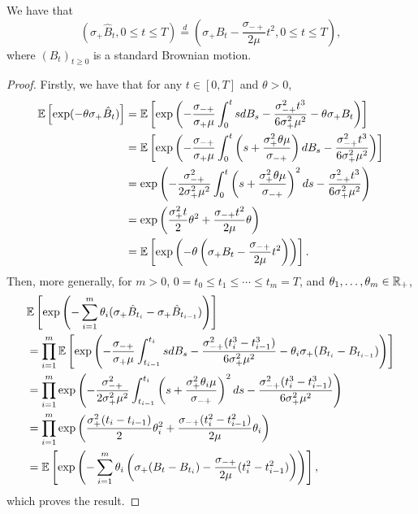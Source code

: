  \begin{proposition}
 \label{prop:characterizelimitprocess}
 We have that
 $$(\sigma_+ \hat{B}_t, {0\leq t\leq T})\overset{d}{=}\left(\sigma_+ B_t-\frac{\sigma_{-+}}{2\mu}t^2, {0\leq t\leq T}\right),$$
 where $(B_t)_{t\geq 0}$ is a standard Brownian motion.
 \end{proposition}
 \begin{proof}
 Firstly, we have that for any $t\in [0,T]$ and $\theta>0$,
 \begin{align*} {\mathbb E}\left[\exp(-\theta \sigma_+ \hat{B}_t)\right] &= {\mathbb E} \left[ \exp\left(-\frac{\sigma_{-+}}{\sigma_+ \mu}\int_0^t s dB_s-\frac{\sigma_{-+}^2 t^3}{6\sigma_+^2\mu^2}-\theta\sigma_+ B_t  \right)\right]\\
 &={\mathbb E}\left[\exp \left( -\frac{\sigma_{-+}}{\sigma_+ \mu}\int_0^t \left(s+\frac{\sigma_+^2\theta \mu}{\sigma_{-+}}\right) dB_s -\frac{\sigma_{-+}^2 t^3}{6\sigma_+^2\mu^2}\right)\right] \\
 &= \exp\left(-\frac{\sigma_{-+}^2}{2\sigma_+^2 \mu^2}\int_0^t \left(s+\frac{\sigma_+^2\theta \mu}{\sigma_{-+}}\right)^2 ds -\frac{\sigma_{-+}^2 t^3}{6\sigma_+^2\mu^2}\right)\\
 &=\exp\left(\frac{\sigma_+^2 t}{2}\theta^2+\frac{\sigma_{-+} t^2}{2\mu}\theta \right)\\
 &= {\mathbb E} \left[\exp\left(-\theta\left(\sigma_+ B_t - \frac{\sigma_{-+}}{2\mu} t^2\right)\right)\right].
 \end{align*}
 Then, more generally, for $m>0$, $0=t_0\leq t_1\leq \cdots \leq t_m=T$, and $\theta_1, \dots, \theta_m \in {\mathbb R}_+$, 
 \begin{align*}
     &{\mathbb E}\left[\exp\left(-\sum_{i=1}^m \theta_i(\sigma_+\hat{B}_{t_i}-\sigma_+\hat{B}_{t_{i-1}})\right)\right]\\
     &= \prod_{i=1}^m {\mathbb E}\left[\exp\left(-\frac{\sigma_{-+}}{\sigma_+\mu} \int _{t_{i-1}}^{t_i} s dB_s-\frac{\sigma_{-+}^2 (t_i^3-t_{i-1}^3)}{6\sigma_+^2 \mu^2}-\theta_i \sigma_+  (B_{t_i}-B_{t_{i-1}})\right)\right]\\
     &= \prod_{i=1}^m  \exp\left( -\frac{\sigma_{-+}^2}{2\sigma_+^2 \mu^2}\int_{t_{i-1}}^{t_i}\left(s+\frac{\sigma_+^2\theta_i\mu}{\sigma_{-+}}\right)^2 ds - \frac{\sigma_{-+}^2 (t_i^3-t_{i-1}^3)}{6\sigma_+^2 \mu^2} \right)\\
     &=  \prod_{i=1}^m \exp\left(\frac{ \sigma_+^2 (t_i-t_{i-1}) }{2}\theta_i^2+\frac{\sigma_{-+} (t_i^2-t_{i-1}^2)}{2\mu}\theta_i \right)\\
     &={\mathbb E} \left[\exp\left(-\sum_{i=1}^m\theta_i\left(\sigma_+ (B_t-B_{t_i}) - \frac{\sigma_{-+}}{2\mu} (t_i^2-t_{i-1}^2)\right)\right)\right],
 \end{align*}
 which proves the result.
 \end{proof}
